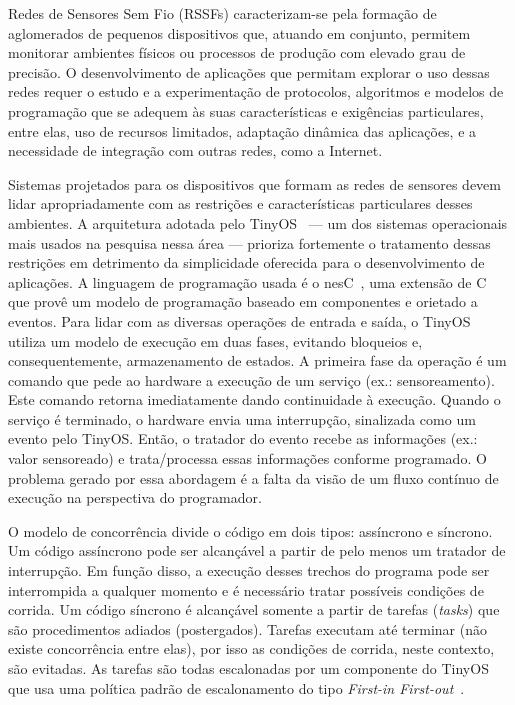 Redes de Sensores Sem Fio (RSSFs) caracterizam-se pela formação de aglomerados de pequenos 
dispositivos que, atuando em conjunto, permitem monitorar ambientes físicos ou processos de 
produção com elevado grau de precisão. O desenvolvimento de aplicações que permitam explorar 
o uso dessas redes requer o estudo e a experimentação de protocolos, algoritmos e modelos de 
programação que se adequem às suas características e exigências particulares, entre elas, uso
de recursos limitados, adaptação dinâmica das aplicações, e a necessidade de integração com
outras redes, como a Internet.

Sistemas projetados para os dispositivos que formam as redes de sensores devem lidar apropriadamente
com as restrições e características particulares desses ambientes. 
A arquitetura adotada pelo TinyOS~\cite{tinyos/00} --- um dos sistemas operacionais mais usados
na pesquisa nessa área --- prioriza fortemente o tratamento dessas restrições em 
detrimento da simplicidade oferecida para o desenvolvimento de aplicações. 
A linguagem de programação usada é o nesC~\cite{nesc/03}, uma extensão de C que provê um modelo de programação baseado
em componentes e orietado a eventos.
Para lidar com as diversas operações de entrada e saída, o TinyOS utiliza um modelo de 
execução em duas fases, evitando bloqueios e, consequentemente, armazenamento de estados. 
A primeira fase da operação é um comando que pede ao hardware a execução de um serviço 
(ex.: sensoreamento). Este comando retorna imediatamente dando continuidade à execução. Quando o
serviço é terminado, o hardware envia uma interrupção, sinalizada como um evento pelo TinyOS. 
Então, o tratador do evento recebe as informações (ex.: valor sensoreado) e trata/processa essas informações conforme programado. 
O problema gerado por essa abordagem é a falta da visão de um fluxo contínuo de execução 
na perspectiva do programador. 

O modelo de concorrência divide o código em dois tipos: assíncrono e síncrono. 
Um código assíncrono pode ser alcançável a partir de pelo menos
um tratador de interrupção. Em função disso, a execução desses trechos do programa pode ser interrompida
a qualquer momento e é necessário tratar possíveis condições de corrida.
Um código síncrono é alcançável somente a partir de tarefas (\textit{tasks}) que são 
procedimentos adiados (postergados). Tarefas executam até terminar (não existe concorrência entre elas), 
por isso as condições de corrida, neste contexto, são evitadas.  
As tarefas são todas escalonadas por um componente do TinyOS que usa uma política padrão de escalonamento 
do tipo \textit{First-in First-out}~\cite{LevisGay/09}.

